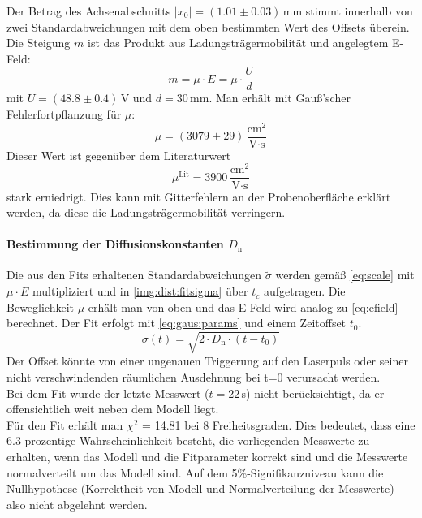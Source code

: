 Der Betrag des Achsenabschnitts $|x_0| = (1.01 \pm 0.03)$\,mm stimmt innerhalb von zwei Standardabweichungen mit dem oben bestimmten Wert des 
Offsets überein.\\
Die Steigung $m$ ist das Produkt aus Ladungsträgermobilität und angelegtem E-Feld:
\begin{equation}
  \label{eq:efield}
  m = \mu \cdot E = \mu \cdot \frac{U}{d}
\end{equation}
mit $U = (48.8 \pm 0.4)$\,V und $d=30$\,mm. Man erhält mit Gauß'scher Fehlerfortpflanzung für $\mu$:
\begin{equation}
  \mu = (3079 \pm 29)\,\frac{\text{cm}^2}{\text{V} \cdot \text{s}}
\end{equation}
Dieser Wert ist gegenüber dem Literaturwert
\begin{equation}
  \mu^{\text{Lit}} = 3900\,\frac{\text{cm}^2}{\text{V} \cdot \text{s}}
\end{equation}
stark erniedrigt. Dies kann mit Gitterfehlern an der Probenoberfläche erklärt werden, da diese die Ladungsträgermobilität verringern.

\paragraph{Bestimmung der Diffusionskonstanten $D_\text{n}$}
Die aus den Fits erhaltenen Standardabweichungen $\tilde{\sigma}$ werden gemäß \autoref{eq:scale} mit $\mu \cdot E$ multipliziert und 
in \autoref{img:dist:fitsigma} über $t_c$ aufgetragen. Die Beweglichkeit $\mu$ erhält man von oben und das E-Feld wird analog zu \autoref{eq:efield} berechnet.
Der Fit erfolgt mit \autoref{eq:gaus:params} und einem Zeitoffset $t_0$.
\begin{equation}
  \sigma(t) = \sqrt{2 \cdot D_\text{n} \cdot (t-t_0)}
\end{equation}
Der Offset könnte von einer ungenauen Triggerung auf den Laserpuls oder seiner nicht verschwindenden räumlichen Ausdehnung
bei t=0 verursacht werden. \\
Bei dem Fit wurde der letzte Messwert ($t=22$\,\textmu s) nicht berücksichtigt, da er offensichtlich weit neben dem Modell liegt.\\
Für den Fit erhält man $\chi ^2$ = 14.81 bei 8 Freiheitsgraden.
Dies bedeutet, dass eine 6.3-prozentige Wahrscheinlichkeit besteht,
die vorliegenden Messwerte zu erhalten,
wenn das Modell und die Fitparameter korrekt sind und die Messwerte normalverteilt um das Modell sind.
Auf dem 5\%-Signifikanzniveau kann die Nullhypothese (Korrektheit von Modell und Normalverteilung der Messwerte)
also nicht abgelehnt werden.



